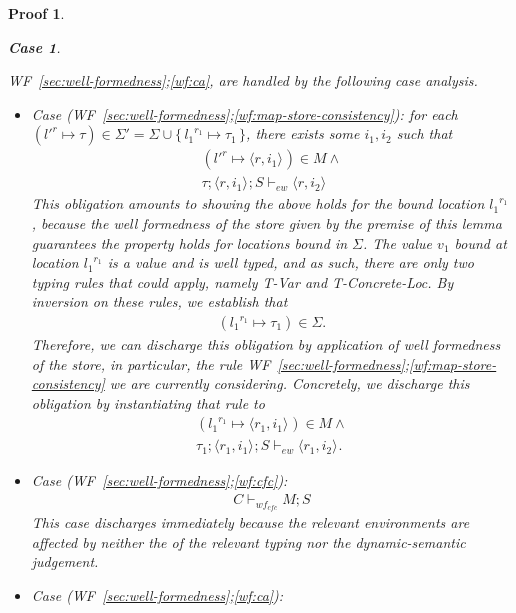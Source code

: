 \documentclass[showabstract,showacknowledgments,showpreface,showdedication,school]{iuphd}
\newtheorem*{bcase}{Case}
\theoremstyle{nonumberplain}
\newtheorem{nproof}{Proof}
\newcommand{\keywd}[1]{\mathit{#1}}
\newcommand{\skeywd}[1]{\mathit{#1}}
\newcommand{\TYP}{\keywd{\tau}}
\newcommand{\loc}{\skeywd{l}}
\newcommand{\concreteloc}[3]{\ensuremath{\langle #1, #2 \rangle ^{#3}}}
\newcommand{\reg}{\skeywd{r}}
\newcommand{\ind}{\keywd{i}}
\newcommand{\VAL}{\keywd{v}}
\newcommand{\STOR}{\keywd{S}}
\newcommand\set[1]{\{ \, \ensuremath{#1} \,\}}
\newcommand{\CENV}{\keywd{C}}
\newcommand{\SENV}{\keywd{\Sigma}}
\newcommand{\MENV}{\keywd{M}}
\newcommand{\locreg}[2]{\ensuremath{{#1}^{#2}}}
\newcommand{\ewitness}[4]{\ensuremath{#1;#2;#3 \vdash_{ew} #4}}
\newcommand{\storewfcfa}[3]{\ensuremath{#1 \vdash_{wf_{cfc}} #2;#3}}
\newcommand{\refwellformed}[2]{WF~\ref{#1};\ref{#2}}
\newcommand{\tvar}{T-Var}
\newcommand{\tconcreteloc}{T-Concrete-Loc}
\begin{document}
\begin{nproof}
\begin{bcase}
\begin{itemize}
        \refwellformed{sec:well-formedness}{wf:ca},
        are handled by the following case analysis.
    \begin{itemize}
      \item
      Case (\refwellformed{sec:well-formedness}{wf:map-store-consistency}):
      for each $(\locreg{\loc'}{\reg} \mapsto \TYP) \in \SENV' = \SENV \cup \set{\locreg{\loc_1}{\reg_1} \mapsto \TYP_1}$, there exists some $\ind_1, \ind_2$ such that
      \begin{align*}
      (\locreg{\loc'}{\reg} \mapsto \concreteloc{\reg}{\ind_1}{}) \in \MENV \wedge \\
        \ewitness{\TYP}{\concreteloc{\reg}{\ind_1}{}}{\STOR}{\concreteloc{\reg}{\ind_2}{}}
      \end{align*}
      This obligation amounts to showing the above holds for the bound location
      $\locreg{\loc_1}{\reg_1}$, because the well formedness of the
      store given by the premise of this lemma guarantees the property
      holds for locations bound in $\SENV$.
      The value $\VAL_1$ bound at location $\locreg{\loc_1}{\reg_1}$ is
      a value and is well typed, and as such, there are only two typing
      rules that could apply, namely \tvar{} and \tconcreteloc{}.
      By inversion on these rules, we establish that
      \begin{align*}
      (\locreg{\loc_1}{\reg_1} \mapsto \TYP_1) \in \SENV.
      \end{align*}
      Therefore, we can discharge this obligation by application of well formedness of the
      store, in particular, the rule
      \refwellformed{sec:well-formedness}{wf:map-store-consistency} we
      are currently considering.
      Concretely, we discharge this obligation by instantiating that rule to
      \begin{align*}
      (\locreg{\loc_1}{\reg_1} \mapsto \concreteloc{\reg_1}{\ind_1}{}) \in \MENV \wedge \\
        \ewitness{\TYP_1}{\concreteloc{\reg_1}{\ind_1}{}}{\STOR}{\concreteloc{\reg_1}{\ind_2}{}}.
      \end{align*}
      \item Case (\refwellformed{sec:well-formedness}{wf:cfc}):
      \begin{align*}
      \storewfcfa{\CENV}{\MENV}{\STOR}
      \end{align*}
      This case discharges immediately because the relevant environments
      are affected by neither the of the relevant typing nor the dynamic-semantic judgement.
      \item Case (\refwellformed{sec:well-formedness}{wf:ca}):

\end{itemize}
\end{itemize}
\end{bcase}
\end{nproof}
\end{document}
